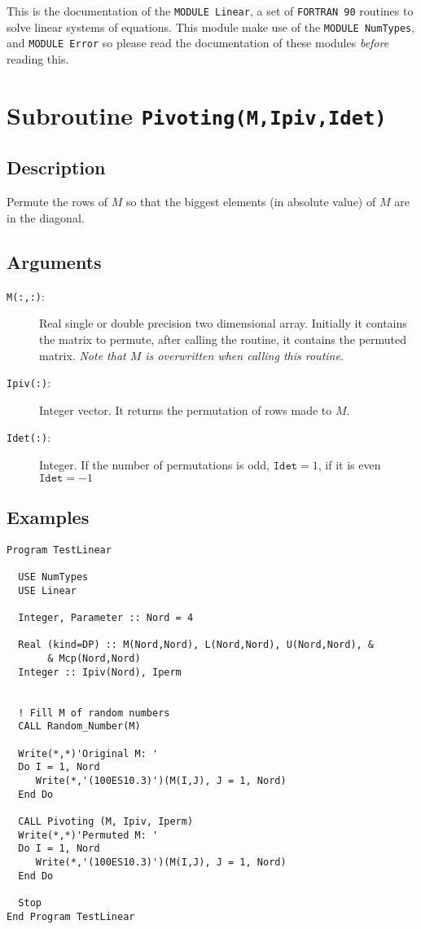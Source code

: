 This is the documentation of the \texttt{MODULE Linear}, a set
of \texttt{FORTRAN 90} routines to solve linear systems of
equations. This module make use of the \texttt{MODULE NumTypes},
and \texttt{MODULE Error} so please read the
documentation of these modules \emph{before} reading this.


\section{Subroutine \texttt{Pivoting(M,Ipiv,Idet)}}

\subsection{Description}

Permute the rows of $M$ so that the biggest elements (in absolute
value) of $M$ are in the diagonal.

\subsection{Arguments}

\begin{description}
\item[\texttt{M(:,:)}: ] Real single or double precision two dimensional
  array. Initially it contains the matrix to permute, after calling
  the routine, it contains the permuted matrix. \emph{Note that $M$ is
    overwritten when calling this routine}. 
\item[\texttt{Ipiv(:)}: ] Integer vector. It returns the permutation of
  rows made to $M$.
\item[\texttt{Idet(:)}: ] Integer. If the number of permutations is odd,
  $\mathtt{Idet}=1$, if it is even $\mathtt{Idet}=-1$
\end{description}

\subsection{Examples}

\begin{verbatim}
Program TestLinear

  USE NumTypes
  USE Linear

  Integer, Parameter :: Nord = 4

  Real (kind=DP) :: M(Nord,Nord), L(Nord,Nord), U(Nord,Nord), &
       & Mcp(Nord,Nord)
  Integer :: Ipiv(Nord), Iperm


  ! Fill M of random numbers
  CALL Random_Number(M)

  Write(*,*)'Original M: '
  Do I = 1, Nord
     Write(*,'(100ES10.3)')(M(I,J), J = 1, Nord)
  End Do

  CALL Pivoting (M, Ipiv, Iperm)
  Write(*,*)'Permuted M: '
  Do I = 1, Nord
     Write(*,'(100ES10.3)')(M(I,J), J = 1, Nord)
  End Do

  Stop
End Program TestLinear
\end{verbatim}


